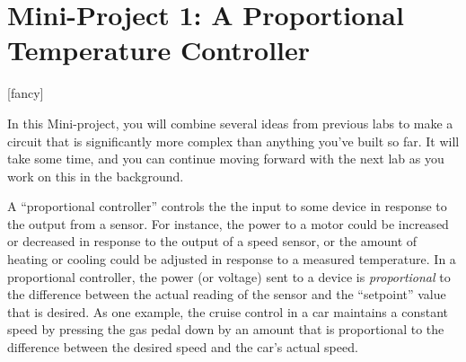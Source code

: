 \section*{Mini-Project 1: A Proportional Temperature Controller}
\label{lab_proportional_controller}

[fancy]{%
	\fancyhead[LO,RE]{}
}
\pagestyle{interlude}



\bigskip

In this Mini-project, you will combine several ideas from previous labs to make a circuit that is significantly more complex than anything you've built so far.  It will take some time, and you can continue moving forward with the next lab as you work on this in the background.  

\medskip

A ``proportional controller'' controls the the input to some device in response to the output from a sensor.  For instance, the power to a motor could be increased or decreased in response to the output of a speed sensor, or the amount of heating or cooling could be adjusted in response to a measured temperature.  
In a proportional controller, the power (or voltage) sent to a device is \textit{proportional} to the difference between the actual reading of the sensor and the ``setpoint'' value that is desired.  As one example, the cruise control in a car maintains a constant speed by pressing the gas pedal down by an amount that is proportional to the difference between the desired speed and the car's actual speed.

